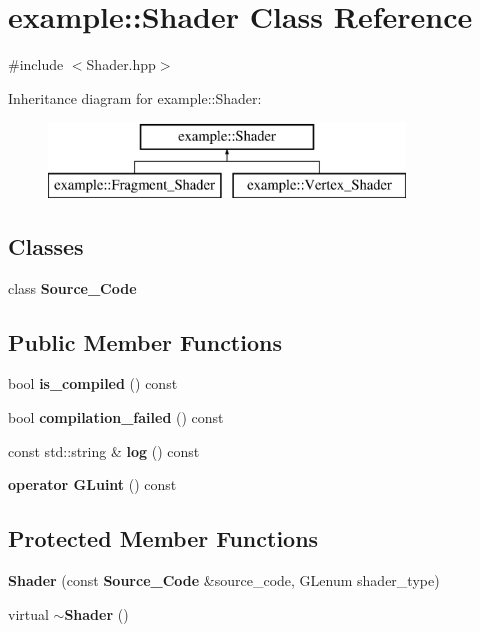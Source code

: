 \section{example\+::Shader Class Reference}
\label{classexample_1_1_shader}


{\ttfamily \#include $<$Shader.\+hpp$>$}

Inheritance diagram for example\+::Shader\+:\begin{figure}[H]
\begin{center}
\leavevmode
\includegraphics[height=2.000000cm]{classexample_1_1_shader}
\end{center}
\end{figure}
\subsection*{Classes}
\begin{DoxyCompactItemize}
\item 
class \textbf{ Source\+\_\+\+Code}
\end{DoxyCompactItemize}
\subsection*{Public Member Functions}
\begin{DoxyCompactItemize}
\item 
bool \textbf{ is\+\_\+compiled} () const
\item 
bool \textbf{ compilation\+\_\+failed} () const
\item 
const std\+::string \& \textbf{ log} () const
\item 
\textbf{ operator G\+Luint} () const
\end{DoxyCompactItemize}
\subsection*{Protected Member Functions}
\begin{DoxyCompactItemize}
\item 
\textbf{ Shader} (const \textbf{ Source\+\_\+\+Code} \&source\+\_\+code, G\+Lenum shader\+\_\+type)
\item 
virtual \textbf{ $\sim$\+Shader} ()
\end{DoxyCompactItemize}



